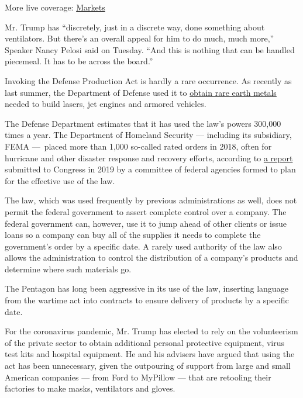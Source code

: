 More live coverage:
\href{https://www.nytimes.com/live/2020/08/03/business/stock-market-today-coronavirus?action=click\&pgtype=Article\&state=default\&region=MAIN_CONTENT_1\&context=storylines_live_updates}{Markets}

Mr. Trump has ``discretely, just in a discrete way, done something about
ventilators. But there's an overall appeal for him to do much, much
more,'' Speaker Nancy Pelosi said on Tuesday. ``And this is nothing that
can be handled piecemeal. It has to be across the board.''

Invoking the Defense Production Act is hardly a rare occurrence. As
recently as last summer, the Department of Defense used it to
\href{https://www.businessdefense.gov/News/News-Display/Article/1913110/defense-production-act-title-iii-presidential-determinations-to-strengthen-the/}{obtain
rare earth metals} needed to build lasers, jet engines and armored
vehicles.

The Defense Department estimates that it has used the law's powers
300,000 times a year. The Department of Homeland Security --- including
its subsidiary, FEMA ---~placed more than 1,000 so-called rated orders
in 2018, often for hurricane and other disaster response and recovery
efforts, according to
\href{https://www.fema.gov/media-library-data/1582898704576-dc44bbe61cce3cf763cc8a6b92617188/2018_DPAC_Report_to_Congress.pdf}{a
report} submitted to Congress in 2019 by a committee of federal agencies
formed to plan for the effective use of the law.

The law, which was used frequently by previous administrations as well,
does not permit the federal government to assert complete control over a
company. The federal government can, however, use it to jump ahead of
other clients or issue loans so a company can buy all of the supplies it
needs to complete the government's order by a specific date. A rarely
used authority of the law also allows the administration to control the
distribution of a company's products and determine where such materials
go.

The Pentagon has long been aggressive in its use of the law, inserting
language from the wartime act into contracts to ensure delivery of
products by a specific date.

For the coronavirus pandemic, Mr. Trump has elected to rely on the
volunteerism of the private sector to obtain additional personal
protective equipment, virus test kits and hospital equipment. He and his
advisers have argued that using the act has been unnecessary, given the
outpouring of support from large and small American companies --- from
Ford to MyPillow --- that are retooling their factories to make masks,
ventilators and gloves.

